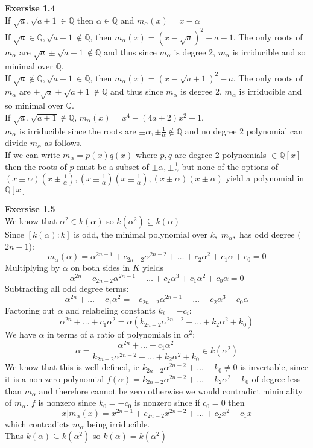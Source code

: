\documentclass[12pt]{article}
\newenvironment{ques}[1]{\textbf{Exersise #1}\vspace{1 mm}\\ }{\bigskip}
\theoremstyle{definition}
\newcommand{\Q}{\mathbb Q}
\renewcommand{\a}{\alpha}
\begin{document}
\begin{ques}{1.4}
	If $\sqrt a, \sqrt {a + 1} \in \Q$ then $\alpha \in \Q$ and $m_\a(x) = x - \a$\\
	If $\sqrt a \in \Q, \sqrt {a + 1} \notin \Q$, then $m_\a(x) = (x - \sqrt
	a)^2 - a - 1$. The only roots of $m_\a$ are $\sqrt a \pm \sqrt{a + 1}
	\notin \Q$ and thus since $m_\a$ is degree 2, $m_\a$ is irriducible and so
	minimal over $\Q$.
	\\
	If $\sqrt a \notin \Q, \sqrt {a + 1} \in \Q$, then $m_\a(x) = (x - \sqrt{a
	+ 1})^2 - a$. The only roots of $m_\a$ are $\pm \sqrt a + \sqrt{a + 1}
	\notin \Q$ and thus since $m_\a$ is degree 2, $m_\a$ is irriducible and so
	minimal over $\Q$.
	\\
	If $\sqrt a, \sqrt {a + 1} \notin \Q$, $m_\a(x) = x^4 - (4a + 2)x^2 + 1$.\\
	$m_\a$ is irriducible since the roots are $\pm \a, \pm \frac 1 \a \notin
	\Q$ and no degree $2$ polynomial can divide $m_\a$ as follows.\\
	If we can write $m_\a = p(x)q(x)$ where $p,q$ are degree 2 polynomials $\in
	\Q[x]$ then the roots of $p$ must be a subset of $\pm \a, \pm \frac 1 \a$
	but none of the options of $(x \pm \a)(x \pm \frac 1 \a), (x \pm \frac 1
	\a)(x \pm \frac 1 \a),  (x \pm \a)(x \pm \a)$ yield a polynomial in $\Q[x]$
\end{ques}

\begin{ques}{1.5}
	We know that $\a ^2 \in k(\a)$ so $k(\a^2) \subseteq k(\a)$\\
	Since $[k(\a): k]$ is odd, the minimal polynomial over $k,$ $m_\a,$ has odd
	degree ($2n-1$):
	$$m_\a(\a) = \a^{2n -1} + c_{2n-2}\a^{2n-2}+ \dots +c_2\a ^2 +c_1\a +
	c_0 = 0$$ 
	Multiplying by $\a$ on both sides in $K$ yields
	$$\a^{2n} + c_{2n-2}\a^{2n-1}+ \dots +c_2\a ^3 +c_1\a^2 +
	c_0\a = 0$$ 
	Subtracting all odd degree terms:
	$$\a^{2n} + \dots +c_1\a^2 = -c_{2n-2}\a^{2n-1} - \dots - c_2\a^3 - c_0\a$$ 
	Factoring out $\a$ and relabeling constants $k_i = -c_i$:
	$$\a^{2n} + \dots +c_1\a^2 = \a(k_{2n-2}\a^{2n-2} + \dots + k_2\a^2 + k_0)$$
	We have $\a$ in terms of a ratio of polynomials in $\a^2$:
	$$\a = \frac{\a^{2n} + \dots +c_1\a^2}{k_{2n-2}\a^{2n-2} + \dots +
	k_2\a^2 + k_0} \in k(\a^2)$$
	We know that this is well defined, ie $k_{2n-2}\a^{2n-2} + \dots + k_0 \neq 0$ is
	invertable, since it is a non-zero polynomial $f(\a) = k_{2n-2}\a^{2n-2} +
	\dots + k_2\a^2 + k_0$ of degree less than $m_\a$ and therefore cannot be
	zero otherwise we would contradict minimality of $m_\a$. $f$ is nonzero
	since $k_0 = -c_0$ is nonzero since if $c_0 = 0$ then 
	$$x|m_\a(x) = x^{2n -1} + c_{2n-2}x^{2n-2}+ \dots +c_2x ^2 +c_1x$$
	which contradicts $m_\a$ being irriducible.\\ Thus $k(\a) \subseteq
	k(\a^2)$ so $k(\a) = k(\a^2)$
\end{ques}
\end{document}
